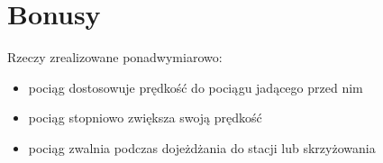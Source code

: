 \documentclass[a4paper, 11pt]{beamer}
\begin{document}
\section{Bonusy}
\begin{frame}
Rzeczy zrealizowane ponadwymiarowo:
\begin{itemize}
\item pociąg dostosowuje prędkość do pociągu jadącego przed nim
\item pociąg stopniowo zwiększa swoją prędkość
\item pociąg zwalnia podczas dojeżdżania do stacji lub skrzyżowania
\end{itemize}
\end{frame}
\end{document}
